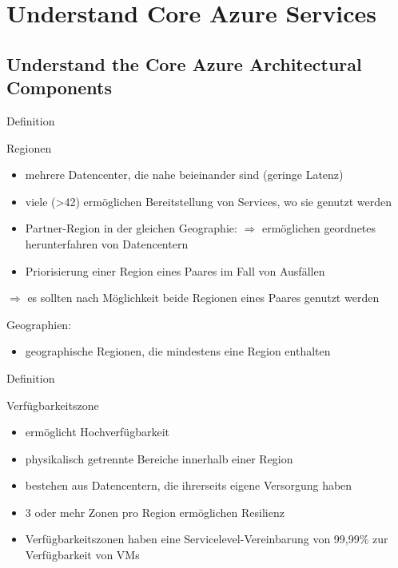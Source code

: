 \documentclass{scrartcl}
\newenvironment{flashcard}[2][]{%
    #1
    \vfill
    \centerline{\Large{#2}}
    \vfill
\newpage
}
{\newpage}
\newcommand{\sectioncard}[1]{
    \vspace*{\stretch{1}}
    \section{#1}
    \vspace*{\stretch{1}}
    \pagebreak
}
\newcommand{\subsectioncard}[1]{
    \vspace*{\stretch{1}}
    \subsection{#1}
    \vspace*{\stretch{1}}
    \pagebreak
}
\begin{document}
    \sectioncard{Understand Core Azure Services}

    \subsectioncard{Understand the Core Azure Architectural Components}

    \begin{flashcard}[Definition]{Regionen}
        \begin{itemize}
            \item mehrere Datencenter, die nahe beieinander sind (geringe Latenz)
            \item viele (>42) ermöglichen Bereitstellung von Services, wo sie genutzt werden
            \item Partner-Region in der gleichen Geographie:\newline
            $\Rightarrow$ ermöglichen geordnetes herunterfahren von Datencentern
            \item Priorisierung einer Region eines Paares im Fall von Ausfällen
        \end{itemize}
        $\Rightarrow$ es sollten nach Möglichkeit beide Regionen eines Paares genutzt werden

        \vspace{5mm}
        Geographien:
        \begin{itemize}
            \item geographische Regionen, die mindestens eine Region enthalten
        \end{itemize}

    \end{flashcard}

    \begin{flashcard}[Definition]{Verfügbarkeitszone}
        \begin{itemize}
            \item ermöglicht Hochverfügbarkeit
            \item physikalisch getrennte Bereiche innerhalb einer Region
            \item bestehen aus Datencentern, die ihrerseits eigene Versorgung haben
            \item 3 oder mehr Zonen pro Region ermöglichen Resilienz
            \item Verfügbarkeitszonen haben eine Servicelevel-Vereinbarung von 99,99\% zur Verfügbarkeit von VMs
        \end{itemize}
    \end{flashcard}
\end{document}
